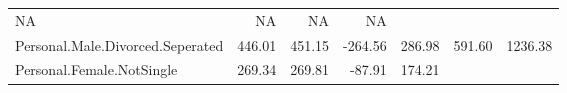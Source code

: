 \documentclass[]{article}
\begin{document}
\begin{longtable}[]{@{}lrrrrrr@{}}
\begin{minipage}[t]{0.08\columnwidth}
NA\strut
\end{minipage} & \begin{minipage}[t]{0.08\columnwidth}\raggedleft\strut
NA\strut
\end{minipage} & \begin{minipage}[t]{0.08\columnwidth}\raggedleft\strut
NA\strut
\end{minipage} & \begin{minipage}[t]{0.08\columnwidth}\raggedleft\strut
NA\strut
\end{minipage}\tabularnewline
\begin{minipage}[t]{0.31\columnwidth}\raggedright\strut
Personal.Male.Divorced.Seperated\strut
\end{minipage} & \begin{minipage}[t]{0.10\columnwidth}\raggedleft\strut
446.01\strut
\end{minipage} & \begin{minipage}[t]{0.08\columnwidth}\raggedleft\strut
451.15\strut
\end{minipage} & \begin{minipage}[t]{0.08\columnwidth}\raggedleft\strut
-264.56\strut
\end{minipage} & \begin{minipage}[t]{0.08\columnwidth}\raggedleft\strut
286.98\strut
\end{minipage} & \begin{minipage}[t]{0.08\columnwidth}\raggedleft\strut
591.60\strut
\end{minipage} & \begin{minipage}[t]{0.08\columnwidth}\raggedleft\strut
1236.38\strut
\end{minipage}\tabularnewline
\begin{minipage}[t]{0.31\columnwidth}\raggedright\strut
Personal.Female.NotSingle\strut
\end{minipage} & \begin{minipage}[t]{0.10\columnwidth}\raggedleft\strut
269.34\strut
\end{minipage} & \begin{minipage}[t]{0.08\columnwidth}\raggedleft\strut
269.81\strut
\end{minipage} & \begin{minipage}[t]{0.08\columnwidth}\raggedleft\strut
-87.91\strut
\end{minipage} & \begin{minipage}[t]{0.08\columnwidth}\raggedleft\strut
174.21\strut
\end{minipage} & \begin{minipage}[t]{0.08\columnwidth}\raggedleft\strut

\end{minipage}
\end{longtable}
\end{document}
